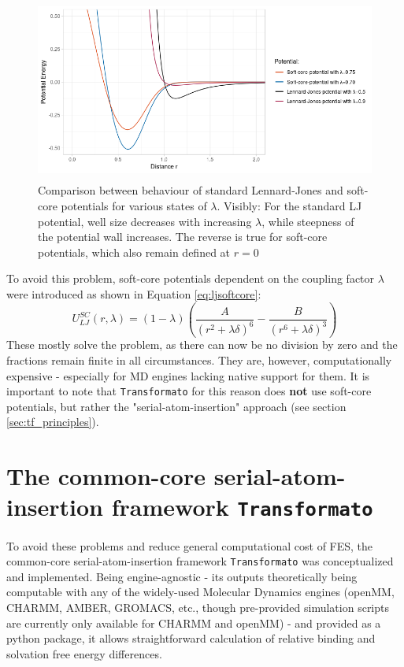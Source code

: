 \documentclass[oneside]{scrreprt}
\begin{document}
\begin{figure}
    \centering
    \includegraphics[height=6cm]{LJandsoftcore.png}
    \caption[Comparision between behaviour of standard LJ potentials vs. soft-core potentials]{Comparison between behaviour of standard Lennard-Jones and soft-core potentials for various states of $\lambda$. Visibly: For the standard LJ potential, well size decreases with increasing $\lambda$, while steepness of the potential wall increases. The reverse is true for soft-core potentials, which also remain defined at $r=0$}
    \label{fig:ljandsoftcore}
\end{figure}

To avoid this problem, soft-core potentials dependent on the coupling factor $\lambda$ were introduced as shown in Equation \ref{eq:ljsoftcore}\cite{Beutler1994Jun}:
\begin{equation}
U_{LJ}^{SC}(r,\lambda)=(1-\lambda)(\frac{A}{(r^2 +\lambda \delta)^6 }-\frac{B}{(r^6 +\lambda \delta)^3})
\label{eq:ljsoftcore}
\end{equation}
These mostly solve the problem, as there can now be no division by zero and the fractions remain finite in all circumstances. They are, however, computationally expensive  - especially for MD engines lacking native support for them\cite{Li2020Aug}. It is important to note that \texttt{Transformato} for this reason does \textbf{not} use soft-core potentials, but rather the "serial-atom-insertion" approach (see section \ref{sec:tf_principles}).


\section{The common-core serial-atom-insertion framework {\texttt{Transformato}}}
To avoid these problems and reduce general computational cost of FES, the common-core serial-atom-insertion framework \texttt{Transformato} was conceptualized and implemented. Being engine-agnostic - its outputs theoretically being computable with any of the widely-used Molecular Dynamics engines (openMM, CHARMM, AMBER, GROMACS, etc., though pre-provided simulation scripts are currently only available for CHARMM and openMM) - and provided as a python package, it allows straightforward calculation of relative binding and solvation free energy differences.
\end{document}

